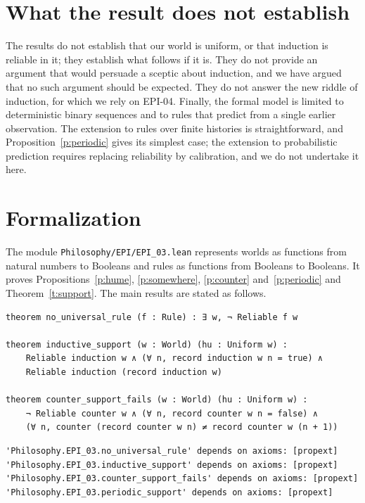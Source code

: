 \documentclass{situationist-preprint}
\begin{document}
\section{What the result does not establish}\label{s:limits}

The results do not establish that our world is uniform, or that induction is reliable in it; they establish what follows if it is. They do not provide an argument that would persuade a sceptic about induction, and we have argued that no such argument should be expected. They do not answer the new riddle of induction, for which we rely on EPI-04. Finally, the formal model is limited to deterministic binary sequences and to rules that predict from a single earlier observation. The extension to rules over finite histories is straightforward, and Proposition~\ref{p:periodic} gives its simplest case; the extension to probabilistic prediction requires replacing reliability by calibration, and we do not undertake it here.

\section{Formalization}

The module \nolinkurl{Philosophy/EPI/EPI_03.lean} represents worlds as functions from natural numbers to Booleans and rules as functions from Booleans to Booleans. It proves Propositions~\ref{p:hume}, \ref{p:somewhere}, \ref{p:counter} and~\ref{p:periodic} and Theorem~\ref{t:support}. The main results are stated as follows.

\begin{lstlisting}
theorem no_universal_rule (f : Rule) : ∃ w, ¬ Reliable f w

theorem inductive_support (w : World) (hu : Uniform w) :
    Reliable induction w ∧ (∀ n, record induction w n = true) ∧
    Reliable induction (record induction w)

theorem counter_support_fails (w : World) (hu : Uniform w) :
    ¬ Reliable counter w ∧ (∀ n, record counter w n = false) ∧
    (∀ n, counter (record counter w n) ≠ record counter w (n + 1))
\end{lstlisting}

\begin{lstlisting}
'Philosophy.EPI_03.no_universal_rule' depends on axioms: [propext]
'Philosophy.EPI_03.inductive_support' depends on axioms: [propext]
'Philosophy.EPI_03.counter_support_fails' depends on axioms: [propext]
'Philosophy.EPI_03.periodic_support' depends on axioms: [propext]
\end{lstlisting}
\end{document}
